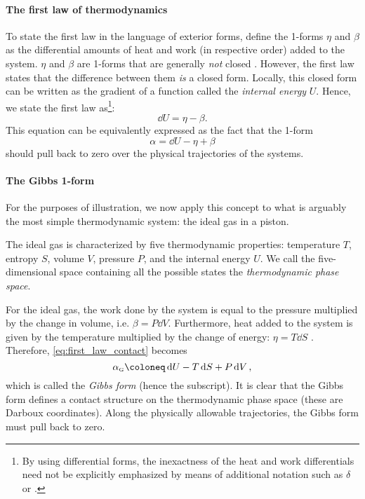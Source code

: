 \paragraph{The first law of thermodynamics} To state the first law in the language of exterior forms, define the 1-forms \(\eta\) and \(\beta\) as the differential amounts of heat and work (in respective order) added to the system. \(\eta\) and \(\beta\) are 1-forms that are generally \emph{not} closed \cite{Bamberg1988,Frankel2012}. However, the first law states that the difference between them \emph{is} a closed form. Locally, this closed form  can be written as the gradient of a function called the \emph{internal energy} \(U\). Hence, we state the first law as\footnote{By using differential forms, the inexactness of the heat and work differentials need not be explicitly emphasized by means of additional notation such as \(\delta\) or \dj.}:
\begin{equation}
    \dd{U} = \eta - \beta.
    \label{eq:thermo_first_law}
\end{equation}
This equation can be equivalently expressed as the fact that the 1-form
\begin{equation}
    \alpha = \dd{U} - \eta + \beta
    \label{eq:first_law_contact}
\end{equation}
should pull back to zero over the physical trajectories of the systems.

\paragraph{The Gibbs 1-form} For the purposes of illustration, we now apply this concept to what is arguably the most simple thermodynamic system: the ideal gas in a piston. 

The ideal gas is characterized by five thermodynamic properties: temperature \(T\), entropy \(S\), volume \(V\), pressure \(P\), and the internal energy \(U\). We call the five-dimensional space containing all the possible states the \emph{thermodynamic phase space}.

For the ideal gas, the work done by the system is equal to the pressure multiplied by the change in volume, i.e. \(\beta = P\dd{V}\). Furthermore, heat added to the system is given by the temperature multiplied by the change of energy: \(\eta = T\dd{S}\) \cite{Arnold1989b,Wightman1979,Bamberg1988}. Therefore, \cref{eq:first_law_contact} becomes
\begin{equation}
    \alpha_\text{\tiny G} \coloneq \dd{U} - T\dd{S} + P\dd{V},
    \label{eq:gibbs_form}
\end{equation}
which is called the \emph{Gibbs form} (hence the subscript). It is clear that the Gibbs form defines a contact structure on the thermodynamic phase space (these are Darboux coordinates). Along the physically allowable trajectories, the Gibbs form must pull back to zero.

